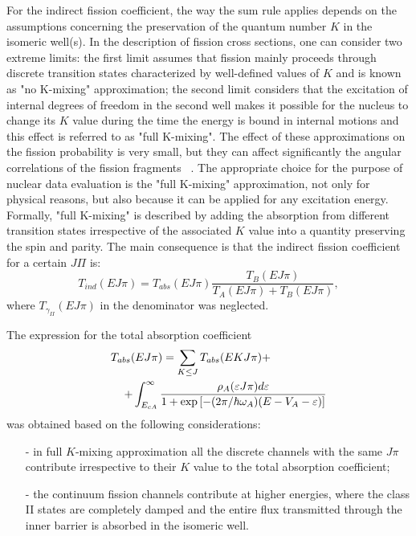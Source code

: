 For the indirect fission coefficient, the way the sum rule applies depends
on the assumptions concerning the preservation of the quantum number $K$ in
the isomeric well(s). In the description of fission cross sections, one can
consider two extreme limits: the first limit assumes that fission mainly
proceeds through discrete transition states characterized by well-defined
values of $K$ and is known as "no K-mixing" approximation; the second limit
considers that the excitation of internal degrees of freedom in the second
well makes it possible for the nucleus to change its $K$ value during the
time the energy is bound in internal motions and this effect is referred to
as "full K-mixing". The effect of these approximations on the fission
probability is very small, but they can affect significantly the angular
correlations of the fission fragments ~\cite{Back:74}. The appropriate
choice for the purpose of nuclear data evaluation is the "full K-mixing"
approximation, not only for physical reasons, but also because it can be
applied for any excitation energy. Formally, "full K-mixing" is described by
adding the absorption from different transition states irrespective of the
associated $K$ value into a quantity preserving the spin and parity. The
main consequence is that the indirect fission coefficient for a certain $%
J\Pi $ is:
\begin{equation}
T_{ind}(E J \pi)=T_{abs}(E J \pi)\frac{T_{B}(E J \pi)}{T_{A}(E J
\pi)+T_{B}(E J \pi)},  \label{tind1}
\end{equation}
where $T_{\gamma_{II}}(E J \pi)$ in the denominator was neglected.

The expression for the total absorption coefficient
\begin{eqnarray}
T_{abs}(EJ\pi)=\sum_{K\le J}T_{abs}(EKJ\pi) +\qquad\qquad\quad  \notag \\
\quad\qquad + \int_{E_{cA}}^{\infty} \frac {\rho_{A}(\varepsilon
J\pi)d\varepsilon} {1+\exp\left[ -(2\pi/\hbar\omega_{A})
(E-V_{A}-\varepsilon)\right] }  \label{tabst}
\end{eqnarray}
was obtained based on the following considerations:

\begin{itemize}
\item[-] in full $K$-mixing approximation all the discrete channels with the
same $J\pi$ contribute irrespective to their $K$ value to the total
absorption coefficient;

\item[-] the continuum fission channels contribute at higher energies, where
the class II states are completely damped and the entire flux transmitted
through the inner barrier is absorbed in the isomeric well.
\end{itemize}

